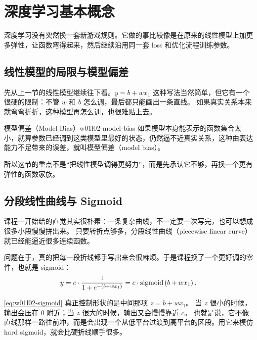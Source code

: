 \documentclass[main.tex]{subfiles}
\begin{document}
\chapter{深度学习基本概念}
\label{chap:w01l02-dl-intro}

\begin{intuitionbox}
深度学习没有突然换一套新游戏规则。它做的事比较像是在原来的线性模型上加更多弹性，让函数弯得起来，然后继续沿用同一套 loss 和优化流程训练参数。
\end{intuitionbox}

\section{线性模型的局限与模型偏差}
\label{sec:w01l02-model-bias}

先从上一节的线性模型继续往下看。$y=b+wx_1$ 这种写法当然简单，但它有一个很硬的限制：不管 $w$ 和 $b$ 怎么调，最后都只能画出一条直线。
如果真实关系本来就弯弯折折，这种模型再怎么训，也很难贴上去。

\begin{definition}{模型偏差（Model Bias）}{w01l02-model-bias}
如果模型本身能表示的函数集合太小，就算参数已经调到这类模型里最好的状态，仍然逼不近真实关系，这种由表达能力不足带来的误差，就叫模型偏差（model bias）。
\end{definition}

所以这节的重点不是“把线性模型调得更努力”，而是先承认它不够，再换一个更有弹性的函数家族。

\section{分段线性曲线与 Sigmoid}
\label{sec:w01l02-sigmoid}

课程一开始给的直觉其实很朴素：一条复杂曲线，不一定要一次写完，也可以想成很多小段慢慢拼出来。
只要转折点够多，分段线性曲线（piecewise linear curve）就已经能逼近很多连续函数。

问题在于，真的把每一段折线都手写出来会很麻烦。于是课程换了一个更好调的零件，也就是 sigmoid：
\begin{equation}
  y = c \cdot \frac{1}{1+e^{-(b+wx_1)}} = c \cdot \operatorname{sigmoid}\left( b+wx_1 \right).
  \label{eq:w01l02-sigmoid}
\end{equation}

\cref{eq:w01l02-sigmoid} 真正控制形状的是中间那项 $z=b+wx_1$。
当 $z$ 很小的时候，输出会压在 0 附近；当 $z$ 很大的时候，输出又会慢慢靠近 $c$。
也就是说，它不像直线那样一路往前冲，而是会出现一个从低平台过渡到高平台的区段。用它来模仿 hard sigmoid，就会比硬折线顺手很多。
\end{document}
